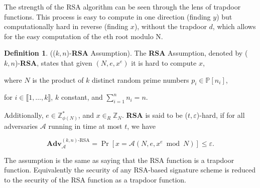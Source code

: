 \documentclass[]{final_report}
\theoremstyle{definition}
\newtheorem{definition}{Definition}[chapter]
\begin{document}
The strength of the RSA algorithm can be seen through the lens of trapdoor functions. This process is easy to compute in one direction (finding \(y\)) but computationally hard in reverse (finding \(x\)), without the trapdoor \(d\), which allows for the easy computation of the eth root modulo N.

\begin{definition}
\label{def:RSA-ASS}
(($k, n$)-\textbf{\textrm{RSA}} Assumption). The \textbf{\textrm{RSA}} Assumption, denoted by ($k, n$)-\textbf{\textrm{RSA}}, states that given $(N, e, x^e)$ it is hard to compute $x$, 

where $N$ is the product of $k$ distinct random prime numbers $p_i \in \mathbb{P}[n_i]$, 

for $i \in \llbracket1, \ldots, k \rrbracket$, $k$ constant, and $\displaystyle\sum_{i=1}^{n} n_i = n$. 

Additionally, $e \in \mathbb{Z}_{\phi(N)}^{*}$, and $x \in_R \mathbb{Z}_N$. \textbf{\textrm{RSA}} is said to be ($t, \varepsilon$)-hard, if for all adversaries $ \mathcal{A}$ running in time at most $t$, we have

\[ \textbf{Adv}_ \mathcal{A}^{(k,n)\text{-RSA}} = \Pr [x =  \mathcal{A}(N, e, x^e \bmod N) ] \leq \varepsilon. \]
\end{definition}



 

The assumption is the same as saying that the RSA function is a trapdoor function. Equivalently the security of any RSA-based signature scheme is reduced to the security of the RSA function as a trapdoor function.
\end{document}
